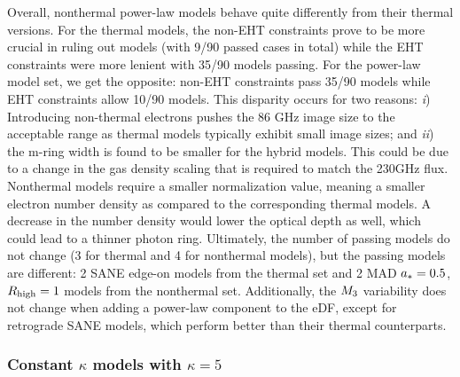 Overall, \hamr nonthermal power-law models behave quite differently from their thermal versions.
For the thermal models, the non-EHT constraints prove to be more crucial in ruling out models (with 9/90 passed cases in total) while the EHT constraints were more lenient with 35/90 models passing.
For the power-law model set, we get the opposite: non-EHT constraints pass 35/90 models while EHT constraints allow 10/90 models.
This disparity occurs for two reasons:
\emph{i}) Introducing non-thermal electrons pushes the 86 GHz image size to the acceptable range as thermal models typically exhibit small image sizes; and
\emph{ii}) the m-ring width is found to be smaller for the hybrid models.
This could be due to a change in the gas density scaling that is required to match the 230GHz flux.
Nonthermal models require a smaller normalization value, meaning a smaller electron number density as compared to the corresponding thermal models.
A decrease in the number density would lower the optical depth as well, which could lead to a thinner photon ring.
Ultimately, the number of passing models do not change (3 for thermal and 4 for nonthermal models), but the passing models are different: 2 SANE edge-on models from the thermal set and 2 MAD $a_*=0.5$, $R_\mathrm{high}=1$ models from the nonthermal set.
Additionally, the $M_{3}$ variability does not change when adding a power-law component to the eDF, except for retrograde SANE models, which perform better than their thermal counterparts.

\subsubsection{Constant \texorpdfstring{$\kappa$}{kappa} models with \texorpdfstring{$\kappa = 5$}{kappa = 5}}

